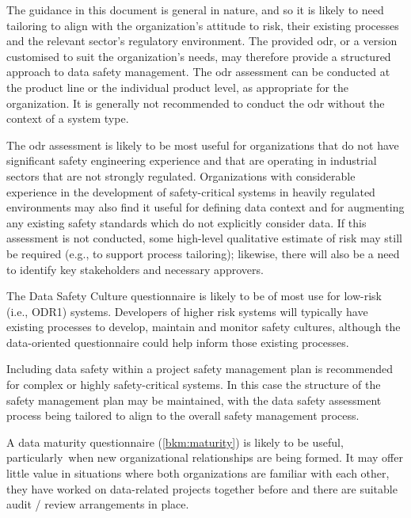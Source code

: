 The guidance in this document is general in nature, and so it is likely to need \gls{tailoring} to align with the organization's attitude to risk, their existing processes and the relevant sector's regulatory environment. The provided \gls{odr}, or a version customised to suit the organization's needs, may therefore provide a structured approach to \cbstart data safety management\cbend.
The \gls{odr} assessment can be conducted at the product line or the individual product level, as appropriate for the organization. It is generally not recommended to conduct the \gls{odr} without the context of a system type.

The \gls{odr} assessment is likely to be most useful for organizations that do not have significant safety engineering experience and that are operating in industrial sectors that are not strongly regulated.
Organizations with considerable experience in the development of safety-critical systems in heavily regulated environments
may also find it useful for defining data context and for augmenting any existing safety standards which do not explicitly consider data.
If this assessment is not conducted, some high-level qualitative estimate of risk may still be required (e.g., to support process \gls{tailoring}); likewise, there will also be a need to identify key \glspl{stakeholder} and necessary approvers.

The Data Safety Culture questionnaire is likely to be of most use for low-risk (i.e., ODR1) systems. Developers of higher risk systems will typically have existing processes to develop, maintain and monitor safety cultures, although the data-oriented questionnaire could help inform those existing processes.

Including data safety within a project safety management plan is recommended for complex or highly safety-critical systems. In this case the structure of the safety management plan may be maintained, with the \gls{data safety assessment} process being tailored to align to the overall \cbstart safety management process\cbend.

\cbstart A data maturity questionnaire (\autoref{bkm:maturity}) is likely to be useful, particularly\cbend\ when new organizational relationships are being formed. It may offer little value in situations where both organizations are familiar with each other, they have worked on data-related projects together before and there are suitable audit / review arrangements in place.

